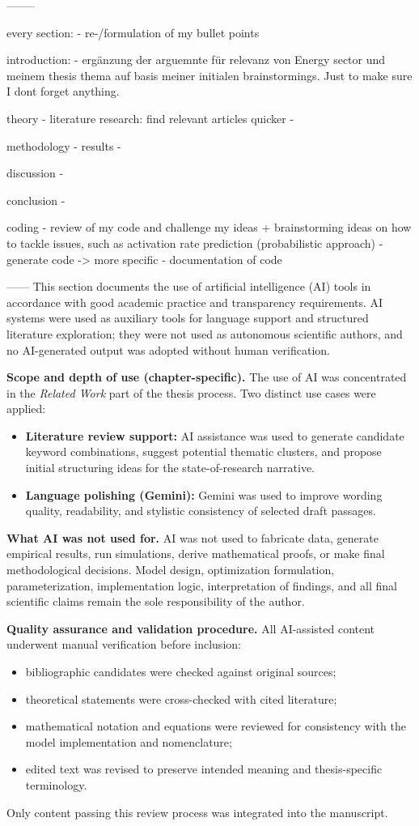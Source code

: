 --------

every section:
- re-/formulation of my bullet points

introduction:
- ergänzung der arguemnte für relevanz von Energy sector und meinem thesis thema auf basis meiner initialen brainstormings. Just to make sure I dont forget anything.

theory
- literature research: find relevant articles quicker
-

methodology
-
results
-

discussion
-

conclusion
-

coding
- review of my code and challenge my ideas + brainstorming ideas on how to tackle issues, such as activation rate prediction (probabilistic approach)
- generate code -> more specific
- documentation of code


------
This section documents the use of artificial intelligence (AI) tools in accordance with good academic practice and transparency requirements. AI systems were used as auxiliary tools for language support and structured literature exploration; they were not used as autonomous scientific authors, and no AI-generated output was adopted without human verification.

\textbf{Scope and depth of use (chapter-specific).}
The use of AI was concentrated in the \textit{Related Work} part of the thesis process. Two distinct use cases were applied:
\begin{itemize}
    \item \textbf{Literature review support:} AI assistance was used to generate candidate keyword combinations, suggest potential thematic clusters, and propose initial structuring ideas for the state-of-research narrative.
    \item \textbf{Language polishing (Gemini):} Gemini was used to improve wording quality, readability, and stylistic consistency of selected draft passages.
\end{itemize}

\textbf{What AI was not used for.}
AI was not used to fabricate data, generate empirical results, run simulations, derive mathematical proofs, or make final methodological decisions. Model design, optimization formulation, parameterization, implementation logic, interpretation of findings, and all final scientific claims remain the sole responsibility of the author.

\textbf{Quality assurance and validation procedure.}
All AI-assisted content underwent manual verification before inclusion:
\begin{itemize}
    \item bibliographic candidates were checked against original sources;
    \item theoretical statements were cross-checked with cited literature;
    \item mathematical notation and equations were reviewed for consistency with the model implementation and nomenclature;
    \item edited text was revised to preserve intended meaning and thesis-specific terminology.
\end{itemize}
Only content passing this review process was integrated into the manuscript.

